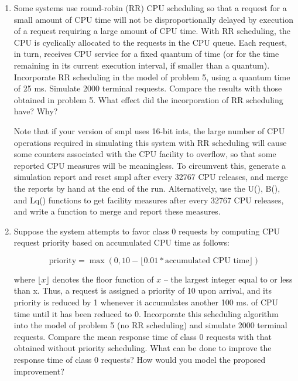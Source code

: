 \begin{enumerate}
\begin{enumerate}
\renewcommand{\labelenumii}{\alph{enumii}.}
\item Some systems use round-robin (RR) CPU scheduling so that a request for a
small amount of CPU time will not be disproportionally delayed by execution of
a request requiring a large amount of CPU time. With RR scheduling, the CPU is
cyclically allocated to the requests in the CPU queue. Each request, in turn,
receives CPU service for a fixed quantum of time (or for the time remaining in
its current execution interval, if smaller than a quantum). Incorporate RR
scheduling in the model of problem 5, using a quantum time of 25 ms. Simulate
2000 terminal requests. Compare the results with those obtained in problem 5.
What effect did the incorporation of RR scheduling have? Why?

Note that if your version of smpl uses 16-bit ints, the large number of CPU
operations required in simulating this system with RR scheduling will cause
some counters associated with the CPU facility to overflow, so that some
reported CPU measures will be meaningless. To circumvent this, generate a
simulation report and reset smpl after every 32767 CPU releases, and merge the
reports by hand at the end of the run. Alternatively, use the U(), B(), and
Lq() functions to get facility measures after every 32767 CPU releases, and
write a function to merge and report these measures.

\item Suppose the system attempts to favor class 0 requests by computing CPU
request priority based on accumulated CPU time as follows:

\[\text{priority} = \max(0, 10 - \lfloor 0.01 * \text{accumulated CPU time}\rfloor)\]

where $\lfloor x\rfloor$ denotes the floor function of $x$ -- the largest integer equal to or
less than x. Thus, a request is assigned a priority of 10 upon arrival, and its
priority is reduced by 1 whenever it accumulates another 100 ms. of CPU time
until it has been reduced to 0. Incorporate this scheduling algorithm into the
model of problem 5 (no RR scheduling) and simulate 2000 terminal requests.
Compare the mean response time of class 0 requests with that obtained without
priority scheduling. What can be done to improve the response time of class 0
requests? How would you model the proposed improvement?
\end{enumerate}
\end{enumerate}
